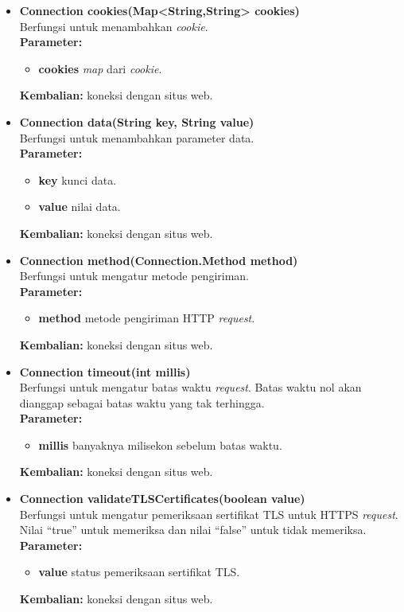 \begin{itemize}
	\item \textbf{Connection cookies(Map<String,String> cookies)} \\
		Berfungsi untuk menambahkan \textit{cookie}. \\
		\textbf{Parameter:}
		\begin{itemize}
			\item \textbf{cookies} \textit{map} dari \textit{cookie}.
		\end{itemize}
		\textbf{Kembalian:} koneksi dengan situs web.
		
		\item \textbf{Connection data(String key, String value)} \\
		Berfungsi untuk menambahkan parameter data. \\
		\textbf{Parameter:}
		\begin{itemize}
			\item \textbf{key} kunci data.
			\item \textbf{value} nilai data.
		\end{itemize}
		\textbf{Kembalian:} koneksi dengan situs web.
		
		\item \textbf{Connection method(Connection.Method method)} \\
		Berfungsi untuk mengatur metode pengiriman. \\
		\textbf{Parameter:}
		\begin{itemize}
			\item \textbf{method} metode pengiriman HTTP \textit{request}.
		\end{itemize}
		\textbf{Kembalian:} koneksi dengan situs web.
		
		\item \textbf{Connection timeout(int millis)} \\
		Berfungsi untuk mengatur batas waktu \textit{request}. Batas waktu nol akan dianggap sebagai batas waktu yang tak terhingga. \\
		\textbf{Parameter:}
		\begin{itemize}
			\item \textbf{millis} banyaknya milisekon sebelum batas waktu.
		\end{itemize}
		\textbf{Kembalian:} koneksi dengan situs web.
		
		\item \textbf{Connection validateTLSCertificates(boolean value)} \\
		Berfungsi untuk mengatur pemeriksaan sertifikat TLS untuk HTTPS \textit{request}. Nilai "`true"' untuk memeriksa dan nilai "`false"' untuk tidak memeriksa.\\
		\textbf{Parameter:}
		\begin{itemize}
			\item \textbf{value} status pemeriksaan sertifikat TLS.
		\end{itemize}
		\textbf{Kembalian:} koneksi dengan situs web.
		

\end{itemize}
